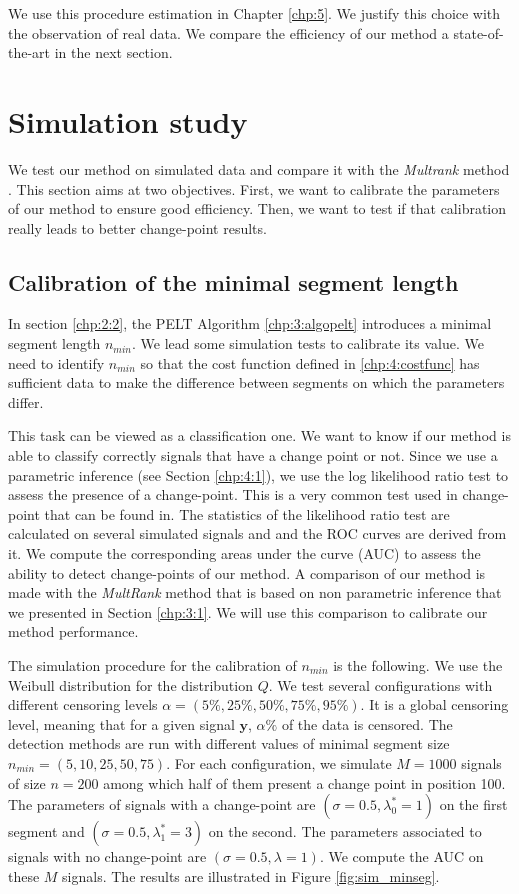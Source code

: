 We use this procedure estimation in Chapter \ref{chp:5}. We justify this choice with the observation of real data. We compare the efficiency of our method a state-of-the-art in the next section.

\section{Simulation study}\label{chp:4:4}

We test our method on simulated data and compare it with the \textit{Multrank} method \cite{lung2015}. This section aims at two objectives. First, we want to calibrate the parameters of our method to ensure good efficiency. Then, we want to test if that calibration really leads to better change-point results.  

\subsection{Calibration of the minimal segment length}

In section \ref{chp:2:2}, the PELT Algorithm \ref{chp:3:algopelt} introduces a minimal segment length $n_{min}$. We lead some simulation tests to calibrate its value. We need to identify $n_{min}$ so that the cost function defined in \ref{chp:4:costfunc} has sufficient data to make the difference between segments on which the parameters differ. 

This task can be viewed as a classification one. We want to know if our method is able to classify correctly signals that have a change point or not. Since we use a parametric inference (see Section \ref{chp:4:1}), we use the log likelihood ratio test to assess the presence of a change-point. This is a very common test used in change-point that can be found in. The statistics of the likelihood ratio test are calculated on several simulated signals and and the ROC curves \citep{Fawcett2006} are derived from it. We compute the corresponding areas under the curve (AUC) to assess the ability to detect change-points of our method. A comparison of our method is made with the \textit{MultRank} method that is based on non parametric inference that we presented in Section \ref{chp:3:1}. We will use this comparison to calibrate our method performance.  

The simulation procedure for the calibration of $n_{min}$ is the following. We use the Weibull distribution for the distribution $Q$. We test several configurations with different censoring levels $\alpha = (5\%,25\%,50\%,75\%,95\%)$. It is a global censoring level, meaning that for a given signal $\bm y$, $\alpha\%$ of the data is censored. The detection methods are run with different values of minimal segment size $n_{min} = (5,10,25,50,75)$. For each configuration, we simulate $M = 1000$ signals of size $n = 200$ among which half of them present a change point in position 100. The parameters of signals with a change-point are $(\sigma = 0.5,\lambda^*_0 = 1)$ on the first segment and $(\sigma = 0.5,\lambda^*_1 = 3)$ on the second. The parameters associated to signals with no change-point are $(\sigma = 0.5,\lambda = 1)$. We compute the AUC on these $M$ signals. The results are illustrated in Figure \ref{fig:sim_minseg}.      

